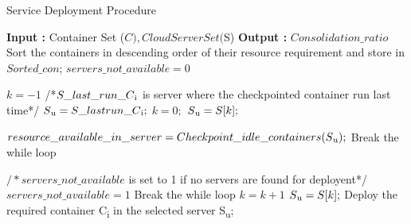 \documentclass[conference]{IEEEtran}
\begin{document}
\begin{algorithm}
\caption{Service Deployment Procedure}
\begin{algorithmic}[1]
\State \textbf{Input : } Container Set ($C), Cloud Server Set ($S)
\State \textbf{Output : } \begin{math}Consolidation\_ratio \end{math}
    \State Sort the containers in descending order of their
resource requirement and store in \begin{math}Sorted\_con\end{math};
 \begin{math} servers\_not\_available = 0\end{math} \EndFor
    
     \State \begin{math}k = -1\end{math} 
\State /*\begin{math}S\_last\_run\_C\textsubscript{i}\end{math} is server where the checkpointed container run last time*/
\State \begin{math}S\textsubscript{u} = S\_last run\_C\textsubscript{i};\end{math}
\Else
\State \begin{math}k = 0;\end{math}
\State \begin{math}S\textsubscript{u} = S[k];\end{math}
    \EndIf

          \State \begin{math}resource\_available\_in\_server =
Checkpoint\_idle\_containers(S\textsubscript{u});\end{math} 
\State Break the while loop

    \EndIf
  \State \begin{math}/*servers\_not\_available\end{math} is set
to 1 if no servers are
found for deployent*/
\State \begin{math}servers\_not\_available = 1\end{math}
\State Break the while loop
\Else
\State  \begin{math}k = k + 1\end{math}
\State \begin{math}S\textsubscript{u} = S[k];\end{math}
    \EndIf
 \If{$servers\_not\_available \neq 1$} \State Deploy the required container C\textsubscript{i} in the selected
server S\textsubscript{u};


\end{algorithmic}
\end{algorithm}
\end{document}
